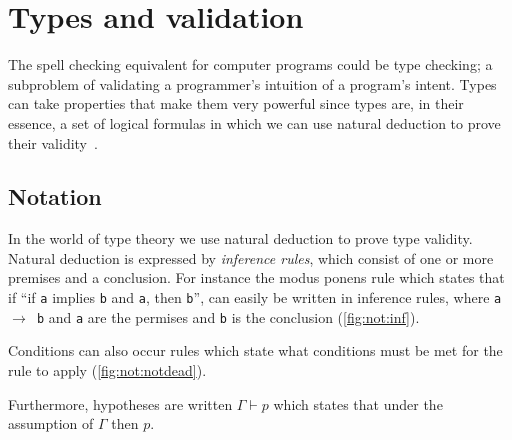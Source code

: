 \documentclass[11pt,oneside,a4paper]{report}
\begin{document}
\section{Types and validation}
\label{sec:types}
The spell checking equivalent for computer programs could be type checking; a subproblem of validating a programmer's intuition of a program's intent.
Types can take properties that make them very powerful since types are, in their essence, a set of logical formulas in which we can use natural deduction to prove their validity~\cite{howard1980formulae}.
\subsection{Notation}
In the world of type theory we use natural deduction to prove type validity.
Natural deduction is expressed by \textit{inference rules}, which consist of one or more premises and a conclusion.
For instance the modus ponens rule which states that if ``if \texttt{a} implies \texttt{b} and \texttt{a}, then \texttt{b}'', can easily be written in inference rules, where \texttt{a $\rightarrow$ b} and \texttt{a} are the permises and \texttt{b} is the conclusion (\autoref{fig:not:inf}).
\begin{figure}
  \begin{mdframed}
  \begin{prooftree}
  \end{prooftree}
  \end{mdframed}
  \caption{}
  \label{fig:not:inf}
\end{figure}
Conditions can also occur rules which state what conditions must be met for the rule to apply (\autoref{fig:not:notdead}).
\begin{figure}
  \begin{mdframed}
  \begin{prooftree}
  \end{prooftree}
  \end{mdframed}
  \caption{}
  \label{fig:not:notdead}
\end{figure}
Furthermore, hypotheses are written $\Gamma \vdash p$ which states that under the assumption of $\Gamma$ then $p$.

\end{document}
